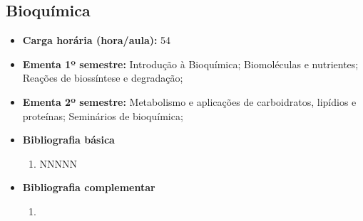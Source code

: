 \documentclass[11pt,fleqn]{book} %
\begin{document}
\subsection{Bioquímica}\label{disc:bioquimica}
\begin{itemize}
	\item \textbf{Carga horária (hora/aula):} 54
	\item \textbf{Ementa 1º semestre:}
	Introdução à Bioquímica; 
	Biomoléculas e nutrientes;
	Reações de biossíntese e degradação;
	\item \textbf{Ementa 2º semestre:}	
	Metabolismo e aplicações de carboidratos, lipídios e proteínas;
	Seminários de bioquímica;
	\item \textbf{Bibliografia básica}
	\begin{enumerate}
		\item NNNNN
	\end{enumerate}
	\item \textbf{Bibliografia complementar}
	\begin{enumerate}
		\item 
	\end{enumerate}	
\end{itemize}


\newpage
\end{document}
